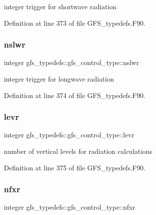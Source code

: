 integer trigger for shortwave radiation 



Definition at line 373 of file G\+F\+S\+\_\+typedefs.\+F90.

\mbox{\label{structgfs__typedefs_1_1gfs__control__type_a36ed77319de46dec9fceb14ff1cb74f4}} 
\subsubsection{nslwr}
{\footnotesize\ttfamily integer gfs\+\_\+typedefs\+::gfs\+\_\+control\+\_\+type\+::nslwr}



integer trigger for longwave radiation 



Definition at line 374 of file G\+F\+S\+\_\+typedefs.\+F90.

\mbox{\label{structgfs__typedefs_1_1gfs__control__type_a5c1f5694e7ca29ae141518c6192da337}} 
\subsubsection{levr}
{\footnotesize\ttfamily integer gfs\+\_\+typedefs\+::gfs\+\_\+control\+\_\+type\+::levr}



number of vertical levels for radiation calculations 



Definition at line 375 of file G\+F\+S\+\_\+typedefs.\+F90.

\mbox{\label{structgfs__typedefs_1_1gfs__control__type_ae7be326f75e3275dfb030d4f06a9908f}} 
\subsubsection{nfxr}
{\footnotesize\ttfamily integer gfs\+\_\+typedefs\+::gfs\+\_\+control\+\_\+type\+::nfxr}



